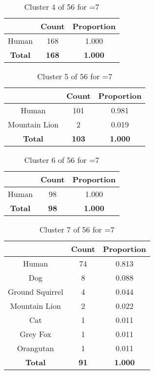 \begin{table}[ht!]
\centering
\begin{tabular}{|c|c|c|}
\hline
\bf \Spec{} &\bf Count &\bf Proportion\\ \hline \hline
Human & 168 & 1.000\\ \hline
\hline
\bf Total & \bf 168 & \bf 1.000\\ \hline
\end{tabular}
\label{tab:cluster:4:7}
\caption{Cluster 4 of 56 for \minneigh{}=7}
\end{table}

\begin{table}[ht!]
\centering
\begin{tabular}{|c|c|c|}
\hline
\bf \Spec{} &\bf Count &\bf Proportion\\ \hline \hline
Human & 101 & 0.981\\ \hline
Mountain Lion & 2 & 0.019\\ \hline
\hline
\bf Total & \bf 103 & \bf 1.000\\ \hline
\end{tabular}
\label{tab:cluster:5:7}
\caption{Cluster 5 of 56 for \minneigh{}=7}
\end{table}

\begin{table}[ht!]
\centering
\begin{tabular}{|c|c|c|}
\hline
\bf \Spec{} &\bf Count &\bf Proportion\\ \hline \hline
Human & 98 & 1.000\\ \hline
\hline
\bf Total & \bf 98 & \bf 1.000\\ \hline
\end{tabular}
\label{tab:cluster:6:7}
\caption{Cluster 6 of 56 for \minneigh{}=7}
\end{table}

\begin{table}[ht!]
\centering
\begin{tabular}{|c|c|c|}
\hline
\bf \Spec{} &\bf Count &\bf Proportion\\ \hline \hline
Human & 74 & 0.813\\ \hline
Dog & 8 & 0.088\\ \hline
Ground Squirrel & 4 & 0.044\\ \hline
Mountain Lion & 2 & 0.022\\ \hline
Cat & 1 & 0.011\\ \hline
Grey Fox & 1 & 0.011\\ \hline
Orangutan & 1 & 0.011\\ \hline
\hline
\bf Total & \bf 91 & \bf 1.000\\ \hline
\end{tabular}
\label{tab:cluster:7:7}
\caption{Cluster 7 of 56 for \minneigh{}=7}
\end{table}

